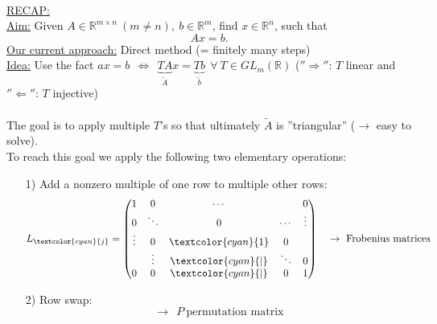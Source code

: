 \begin{frame}
~\\
{\blank
\underline{RECAP:}\\
\underline{Aim:} Given $A\in\mathbb{R}^{m\times n}~(m\neq n),~b\in\mathbb{R}^m$, find $x\in\mathbb{R}^n$, such that $$Ax=b.$$
\underline{Our current approach:} Direct method (= finitely many steps)\\
\underline{Idea:} Use the fact $ax = b~~\Leftrightarrow~~\underbrace{TA}_{\tilde{A}}x=\underbrace{Tb}_{\tilde{b}}~~\forall~T\in GL_m(\mathbb{R})$
($''\Rightarrow''$: $T$ linear and $''\Leftarrow''$: $T$ injective)\\
~\\
The goal is to apply multiple $T$'s so that ultimately $\tilde{A}$ is ''triangular'' ($\rightarrow$ easy to solve).\\
To reach this goal we apply the following two elementary operations:
\begin{itemize}\blank
	\item [1)]
	Add a nonzero multiple of one row to multiple other rows:
	$$
	L_{\textcolor{cyan}{j}} = \begin{pmatrix}
	1&0&\cdots&~&0\\
	0&\ddots&0&\cdots&\vdots\\
	\vdots&0&\textcolor{cyan}{1}&0&~\\
	~&\vdots&\textcolor{cyan}{|}&\ddots&0\\
	0&0&\textcolor{cyan}{|}&0&1
	\end{pmatrix}~~~\rightarrow~\text{Frobenius matrices}
	$$
	\item [2)]
	Row swap:
	$$
	\rightarrow~~P~\text{permutation matrix}
	$$
\end{itemize}
}
\end{frame}
